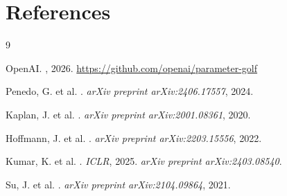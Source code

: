 \documentclass[12pt, letterpaper]{article}
\begin{document}
\section*{References}
\begingroup
\renewcommand{\section}[2]{}
\begin{thebibliography}{9}

OpenAI.
, 2026.
\newblock \url{https://github.com/openai/parameter-golf}

Penedo, G. et al.
.
\newblock \textit{arXiv preprint arXiv:2406.17557}, 2024.

Kaplan, J. et al.
.
\newblock \textit{arXiv preprint arXiv:2001.08361}, 2020.

Hoffmann, J. et al.
.
\newblock \textit{arXiv preprint arXiv:2203.15556}, 2022.

Kumar, K. et al.
.
\newblock \textit{ICLR}, 2025.
\newblock \textit{arXiv preprint arXiv:2403.08540}.

Su, J. et al.
.
\newblock \textit{arXiv preprint arXiv:2104.09864}, 2021.

\end{thebibliography}
\endgroup
\end{document}
